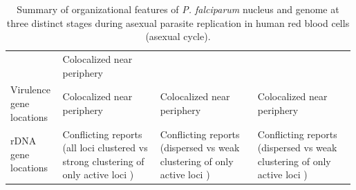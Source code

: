 \begin{table}
\begin{tabular}{p{0.15\linewidth}p{0.28\linewidth}p{0.28\linewidth}p{0.28\linewidth}}
& Colocalized near periphery {\small \citep{ay:three-dimensional, freitas-junior:frequent}}
\\ Virulence gene locations
& Colocalized {\small \citep{lemieux:genome-wide}} near periphery {\small \citep{ay:three-dimensional, lopez-rubio:genome-wide, freitas-junior:frequent}}
& Colocalized near periphery {\small \citep{ay:three-dimensional, lopez-rubio:genome-wide, freitas-junior:frequent}}
& Colocalized near periphery {\small \citep{ay:three-dimensional, lopez-rubio:genome-wide, freitas-junior:frequent}}
\\ rDNA gene locations
& Conflicting reports (all loci clustered {\small \citep{mancio-silva:clustering}} vs strong clustering of only
active loci {\small \citep{ay:three-dimensional, lemieux:genome-wide}})
& Conflicting reports (dispersed {\small \citep{mancio-silva:clustering}} vs weak clustering of only active loci
{\small \citep{ay:three-dimensional}})
& Conflicting reports (dispersed {\small \citep{mancio-silva:clustering}} vs weak clustering of only active loci
{\small \citep{ay:three-dimensional}}) \\
\end{tabular}
\caption{Summary of organizational features of \textit{P. falciparum} nucleus and
genome at three distinct stages during asexual parasite replication in human
red blood cells (asexual cycle).}
\label{table:features}
\end{table}

